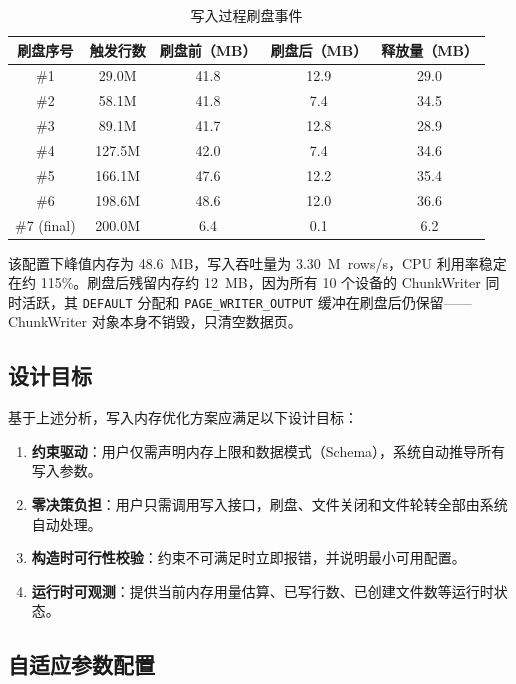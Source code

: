 \begin{table}[htbp]
  \centering
  \caption{写入过程刷盘事件}
  \label{tab:flush-interleaved}
  \begin{tabular}{ccccc}
    \toprule
    刷盘序号 & 触发行数 & 刷盘前（MB） & 刷盘后（MB） & 释放量（MB） \\
    \midrule
    \#1 & 29.0M & 41.8 & 12.9 & 29.0 \\
    \#2 & 58.1M & 41.8 & 7.4 & 34.5 \\
    \#3 & 89.1M & 41.7 & 12.8 & 28.9 \\
    \#4 & 127.5M & 42.0 & 7.4 & 34.6 \\
    \#5 & 166.1M & 47.6 & 12.2 & 35.4 \\
    \#6 & 198.6M & 48.6 & 12.0 & 36.6 \\
    \#7 (final) & 200.0M & 6.4 & 0.1 & 6.2 \\
    \bottomrule
  \end{tabular}
\end{table}

该配置下峰值内存为 48.6~MB，写入吞吐量为 3.30~M~rows/s，CPU 利用率稳定在约 115\%。刷盘后残留内存约 12~MB，因为所有 10 个设备的 ChunkWriter 同时活跃，其 \texttt{DEFAULT} 分配和 \texttt{PAGE\_WRITER\_OUTPUT} 缓冲在刷盘后仍保留——ChunkWriter 对象本身不销毁，只清空数据页。

\subsection{设计目标}

基于上述分析，写入内存优化方案应满足以下设计目标：

\begin{enumerate}
  \item \textbf{约束驱动}：用户仅需声明内存上限和数据模式（Schema），系统自动推导所有写入参数。
  \item \textbf{零决策负担}：用户只需调用写入接口，刷盘、文件关闭和文件轮转全部由系统自动处理。
  \item \textbf{构造时可行性校验}：约束不可满足时立即报错，并说明最小可用配置。
  \item \textbf{运行时可观测}：提供当前内存用量估算、已写行数、已创建文件数等运行时状态。
\end{enumerate}

\subsection{自适应参数配置}

